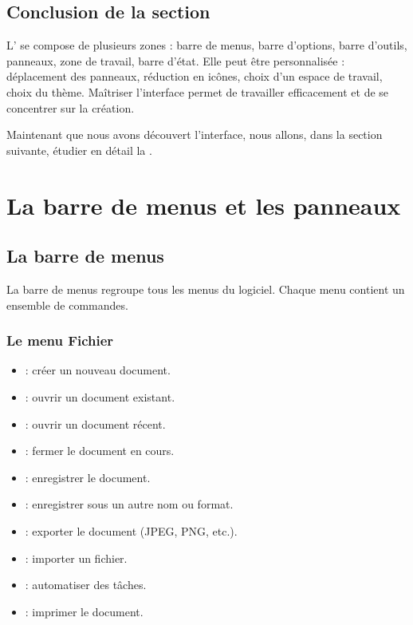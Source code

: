 \subsection*{Conclusion de la section}

L' se compose de plusieurs zones : barre de menus, barre d'options, barre d'outils, panneaux, zone de travail, barre d'état. Elle peut être personnalisée : déplacement des panneaux, réduction en icônes, choix d'un espace de travail, choix du thème. Maîtriser l'interface permet de travailler efficacement et de se concentrer sur la création.

Maintenant que nous avons découvert l'interface, nous allons, dans la section suivante, étudier en détail la .

\section{La barre de menus et les panneaux}

\subsection{La barre de menus}

La barre de menus regroupe tous les menus du logiciel. Chaque menu contient un ensemble de commandes.

\subsubsection{Le menu Fichier}

\begin{itemize}
    \item {} : créer un nouveau document.
    \item {} : ouvrir un document existant.
    \item {} : ouvrir un document récent.
    \item {} : fermer le document en cours.
    \item {} : enregistrer le document.
    \item {} : enregistrer sous un autre nom ou format.
    \item {} : exporter le document (JPEG, PNG, etc.).
    \item {} : importer un fichier.
    \item {} : automatiser des tâches.
    \item {} : imprimer le document.
\end{itemize}

